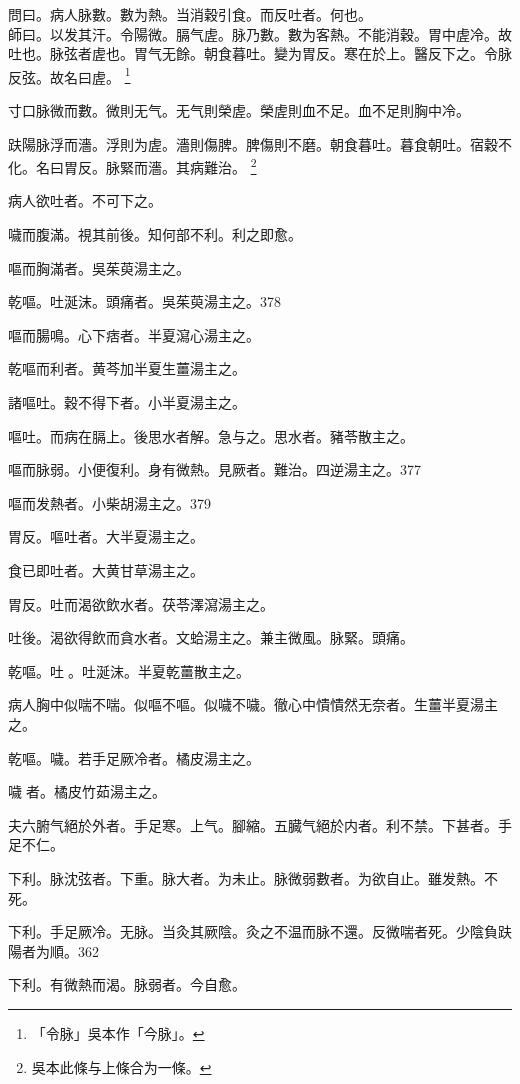 問曰。病人脉數。數为熱。当消穀引食。而反吐者。何也。\\
師曰。以发其汗。令陽微。膈气虗。脉乃數。數为客熱。不能消穀。胃中虗冷。故吐也。脉弦者虗也。胃气无餘。朝食暮吐。變为胃反。寒在於上。醫反下之。令脉反弦。故名曰虗。
	\footnote{
	「令脉」吳本作「今脉」。
	}

寸口脉微而數。微則无气。无气則榮虗。榮虗則血不足。血不足則胸中冷。

趺陽脉浮而濇。浮則为虗。濇則傷脾。脾傷則不磨。朝食暮吐。暮食朝吐。宿穀不化。名曰胃反。脉緊而濇。其病難治。
	\footnote{
	吳本此條与上條合为一條。
	}

病人欲吐者。不可下之。

噦而腹滿。視其前後。知何部不利。利之即愈。

嘔而胸滿者。{\khaaitp 吳}茱萸湯主之。

乾嘔。吐涎沫。頭痛者。{\khaaitp 吳}茱萸湯主之。378

嘔而腸鳴。心下痞者。半夏瀉心湯主之。

乾嘔而利者。黄芩加半夏生薑湯主之。

諸嘔吐。穀不得下者。小半夏湯主之。

嘔吐。而病在膈上。後思水者解。急与之。思水者。豬苓散主之。

嘔而脉弱。小便復利。身有微熱。見厥者。難治。四逆湯主之。377

嘔而发熱者。小柴胡湯主之。379

胃反。嘔吐者。大半夏湯主之。

食已即吐者。大黄甘草湯主之。

胃反。吐而渴欲飲水者。茯苓澤瀉湯主之。

吐後。渴欲得飲而貪水者。文蛤湯主之。兼主微風。脉緊。頭痛。

乾嘔。吐{\sungtpii 𠱘}。吐涎沫。半夏乾薑散主之。

病人胸中似喘不喘。似嘔不嘔。似噦不噦。徹心中憒憒然无奈者。生薑半夏湯主之。

乾嘔。噦。若手足厥{\khaaitp 冷}者。橘皮湯主之。

噦{\sungtpii 𠱘}者。橘皮竹茹湯主之。

夫六腑气絕於外者。手足寒。上气。腳縮。五臓气絕於内者。利不禁。下甚者。手足不仁。

下利。脉沈弦者。下重。脉大者。为未止。脉微弱數者。为欲自止。雖发熱。不死。

下利。手足厥{\khaaitp 冷}。无脉。{\khaaitp 当灸其厥陰。}灸之不温{\khaaitp 而脉不還}。反微喘者死。少陰負趺陽者为順。362

下利。有微熱而渴。脉弱者。今自愈。

